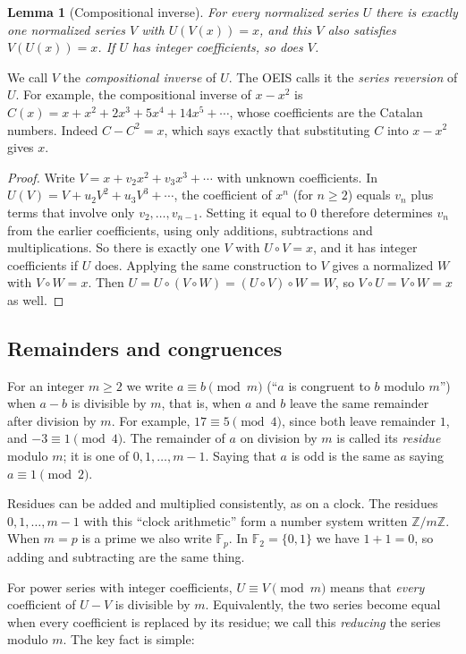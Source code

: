 \documentclass[11pt,a4paper]{article}
\newtheorem{lemma}[theorem]{Lemma}
\theoremstyle{definition}
\theoremstyle{remark}
\newcommand{\Z}{\mathbb{Z}}
\newcommand{\F}{\mathbb{F}}
\begin{document}
\begin{lemma}[Compositional inverse]\label{lem:inverse}
For every normalized series $U$ there is exactly one normalized series $V$ with $U(V(x))=x$, and this $V$ also
satisfies $V(U(x))=x$. If $U$ has integer coefficients, so does $V$.
\end{lemma}

We call $V$ the \emph{compositional inverse} of $U$. The OEIS calls it the \emph{series reversion} of $U$. For example,
the compositional inverse of $x-x^2$ is $C(x)=x+x^2+2x^3+5x^4+14x^5+\cdots$, whose coefficients are the Catalan numbers.
Indeed $C-C^2=x$, which says exactly that substituting $C$ into $x-x^2$ gives $x$.

\begin{proof}
Write $V=x+v_2x^2+v_3x^3+\cdots$ with unknown coefficients. In
$U(V)=V+u_2V^2+u_3V^3+\cdots$, the coefficient of $x^n$ (for $n\ge2$) equals $v_n$ plus terms that involve only
$v_2,\dots,v_{n-1}$. Setting it equal to $0$ therefore determines $v_n$ from the earlier coefficients, using only
additions, subtractions and multiplications. So there is exactly one $V$ with $U\circ V=x$, and it has integer
coefficients if $U$ does. Applying the same construction to $V$ gives a normalized $W$ with $V\circ W=x$. Then
$U=U\circ(V\circ W)=(U\circ V)\circ W=W$, so $V\circ U=V\circ W=x$ as well.
\end{proof}

\subsection{Remainders and congruences}
For an integer $m\ge2$ we write $a\equiv b\pmod m$ (``$a$ is congruent to $b$ modulo $m$'') when $a-b$ is divisible by
$m$, that is, when $a$ and $b$ leave the same remainder after division by $m$. For example, $17\equiv5\pmod 4$, since both leave remainder $1$, and $-3\equiv1\pmod4$. The
remainder of $a$ on division by $m$ is called its \emph{residue} modulo $m$; it is one of $0,1,\dots,m-1$. Saying that
$a$ is odd is the same as saying $a\equiv1\pmod2$.

Residues can be added and multiplied consistently, as on a clock. The residues $0,1,\dots,m-1$ with this ``clock
arithmetic'' form a number system written $\Z/m\Z$. When $m=p$ is a prime we also write $\F_p$. In $\F_2=\{0,1\}$ we
have $1+1=0$, so adding and subtracting are the same thing.

For power series with integer coefficients, $U\equiv V\pmod m$ means that \emph{every} coefficient of $U-V$ is
divisible by $m$. Equivalently, the two series become equal when every coefficient is replaced by its residue; we call
this \emph{reducing} the series modulo $m$. The key fact is simple:
\end{document}
